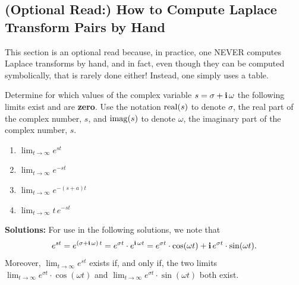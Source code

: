\vspace*{.2cm}
\subsection{(Optional Read:) How to Compute Laplace Transform Pairs by Hand}
\label{sec:LaplaceTransformsByHand}

This section is an optional read because, in practice, one NEVER computes Laplace transforms by hand, and in fact, even though they can be computed symbolically, that is rarely done either! Instead, one simply uses a table. 
\begin{example} 
\label{ex:limitsUsefulForLaplaceTransforms}
Determine for which values of the complex variable $s = \sigma + \mathop{\bm{\mathrm i}} \omega$ the following limits exist and are \textbf{zero}. Use the notation ${\rm real}(s)$ to denote $\sigma$, the real part of the complex number, $s$, and  ${\rm imag}(s)$  to denote $\omega$, the imaginary part of the complex number, $s$.

 \begin{enumerate}
\renewcommand{\labelenumi}{(\alph{enumi})}
\setlength{\itemsep}{.2cm}
    \item   $\displaystyle \lim_{t \to \infty} e^{st} $

     \item  $\displaystyle \lim_{t \to \infty} e^{-st} $

     
    \item  $\displaystyle \lim_{t \to \infty} e^{-(s+a)t} $

     \item  $\displaystyle \lim_{t \to \infty} t\, e^{-st} $

\end{enumerate}
    
\end{example}
\textbf{Solutions:} For use in the following solutions, we note that 
$$e^{st} = e^{( \sigma + \mathop{\bm{\mathrm i}} \omega)\,t}  = e^{\sigma t} \cdot e^{\mathop{\bm{\mathrm i}} \omega t} = e^{\sigma t} \cdot \cos(\omega t) + \mathop{\bm{\mathrm i}} e^{\sigma t} \cdot \sin(\omega t).$$ 
Moreover,  $\displaystyle \lim_{t \to \infty} e^{st}$ exists if, and only if, the two limits $\displaystyle \lim_{t \to \infty} e^{\sigma t} \cdot \cos(\omega t) $ and $\displaystyle \lim_{t \to \infty} e^{\sigma t} \cdot \sin(\omega t) $ both exist. \\


